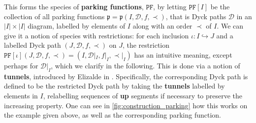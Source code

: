 \documentclass[12pt, reqno]{amsart}
\theoremstyle{definition}
\begin{document}
This forms the species of \textbf{parking functions}, $\mathtt{PF}$, by letting $\mathtt{PF}[I]$ be the collection of all parking functions $\mathfrak{p} = \mathfrak{p}(I, \mathcal D, f, \prec)$, that is Dyck paths $\mathcal D$ in an $|I|\times |I|$ diagram, labelled by elements of $I$ along with an order $\prec$ of $I$.
We can give it a notion of species with restrictions: for each inclusion $\iota : I \hookrightarrow J $ and a labelled Dyck path $(J, \mathcal D, f, \prec)$ on $J$, the restriction $\mathtt{PF}[\iota](J, \mathcal D, f, \prec) = (I, \mathcal D|_I, f|_I, \prec|_I)$ has an intuitive meaning, except perhaps for
$\mathcal D|_I$, which we clarify in the following.
This is done via a notion of \textbf{tunnels}, introduced by Elizalde in \cite{elizalde2003simple}.
Specifically, the corresponding Dyck path is defined to be the restricted Dyck path by taking the \textbf{tunnels} labelled by elements in $I$, relabelling sequences of \textbf{up} segments if necessary to preserve the increasing property.
One can see in \cref{fig:construction_parking} how this works on the example given above, as well as the corresponding parking function.


\begin{figure}[h]
\centering
    \qquad
    \caption{\label{fig:restriction_parking}}%
\end{figure}
\end{document}
